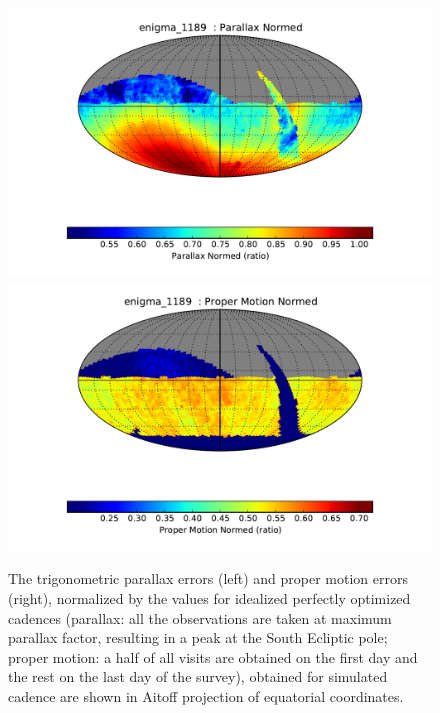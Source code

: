 \begin{figure}[t!]
\vskip -0.0in
\includegraphics[angle=0,width=0.49\hsize:,clip]{figs/enigma_1189_Parallax_Normed__HEAL_SkyMap.pdf}
\includegraphics[angle=0,width=0.49\hsize:,clip]{figs/enigma_1189_Proper_Motion_Normed__HEAL_SkyMap.pdf}
\vskip -0.1in
\caption{The trigonometric parallax errors (left) and proper motion errors (right), normalized
by the values for idealized perfectly optimized cadences (parallax: all the observations are taken
at maximum parallax factor, resulting in a peak at the South Ecliptic pole; proper motion:
a half of all visits are obtained on the first day and the rest on the last day of the survey),
obtained for simulated cadence  are shown in Aitoff projection of equatorial
coordinates.}
\label{fig:parapmenigma}
\end{figure}

